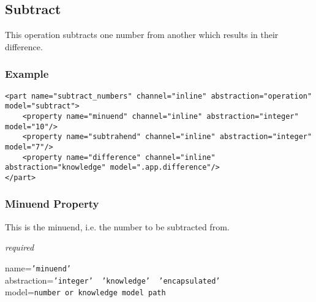 %
%
%
%
%
%

\subsection{Subtract}
\label{subtract_heading}

This operation subtracts one number from another which results in their difference.

\subsubsection{Example}

\begin{scriptsize}
    \begin{verbatim}
<part name="subtract_numbers" channel="inline" abstraction="operation" model="subtract">
    <property name="minuend" channel="inline" abstraction="integer" model="10"/>
    <property name="subtrahend" channel="inline" abstraction="integer" model="7"/>
    <property name="difference" channel="inline" abstraction="knowledge" model=".app.difference"/>
</part>
    \end{verbatim}
\end{scriptsize}

\subsubsection{Minuend Property}

This is the minuend, i.e. the number to be subtracted from.

\emph{required}

name=\texttt{'minuend'}\\
abstraction=\texttt{'integer' \vline\ 'knowledge' \vline\ 'encapsulated'}\\
model=\texttt{number or knowledge model path}

